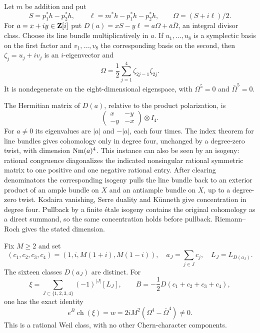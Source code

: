 Let $m$ be addition and put
\[
 S=p_1^*h-p_2^*h,\qquad
 \ell=m^*h-p_1^*h-p_2^*h,\qquad
 \Omega=(S+i\ell)/2.
\]
For $a=x+iy\in\mathbf Z[i]$ put $D(a)=xS-y\ell=a\Omega+\bar a\bar\Omega$, an integral divisor class. Choose its line bundle multiplicatively in $a$. If $u_1,\ldots,u_8$ is a symplectic basis on the first factor and $v_1,\ldots,v_8$ the corresponding basis on the second, then $\zeta_j=u_j+iv_j$ is an $i$-eigenvector and
\[
 \Omega=\frac12\sum_{j=1}^4\zeta_{2j-1}\zeta_{2j}.
\]
It is nondegenerate on the eight-dimensional eigenspace, with $\Omega^5=0$ and $\bar\Omega^5=0$.

The Hermitian matrix of $D(a)$, relative to the product polarization, is
\[
 \begin{pmatrix}x&-y\\-y&-x\end{pmatrix}\otimes I_4.
\]
For $a\ne0$ its eigenvalues are $|a|$ and $-|a|$, each four times. The index theorem for line bundles gives cohomology only in degree four, unchanged by a degree-zero twist, with dimension $\operatorname{Nm}(a)^4$. This instance can also be seen by an isogeny: rational congruence diagonalizes the indicated nonsingular rational symmetric matrix to one positive and one negative rational entry. After clearing denominators the corresponding isogeny pulls the line bundle back to an exterior product of an ample bundle on $X$ and an antiample bundle on $X$, up to a degree-zero twist. Kodaira vanishing, Serre duality and K\"unneth give concentration in degree four. Pullback by a finite \'etale isogeny contains the original cohomology as a direct summand, so the same concentration holds before pullback. Riemann--Roch gives the stated dimension.

\begin{proposition}\label{prop:sixteen-line-character}
Fix $M\ge2$ and set
\[
 (c_1,c_2,c_3,c_4)=(1,i,M(1+i),M(1-i)),
 \quad a_J=\sum_{j\in J}c_j,\quad L_J=L_{D(a_J)}.
\]
The sixteen classes $D(a_J)$ are distinct. For
\[
 \xi=\sum_{J\subset\{1,2,3,4\}}(-1)^{|J|}[L_J],
 \qquad B=-\frac12D(c_1+c_2+c_3+c_4),
\]
one has the exact identity
\[
 e^B\operatorname{ch}(\xi)
   =w=2iM^2(\Omega^4-\bar\Omega^4)\ne0.
\]
This is a rational Weil class, with no other Chern-character components.
\end{proposition}


